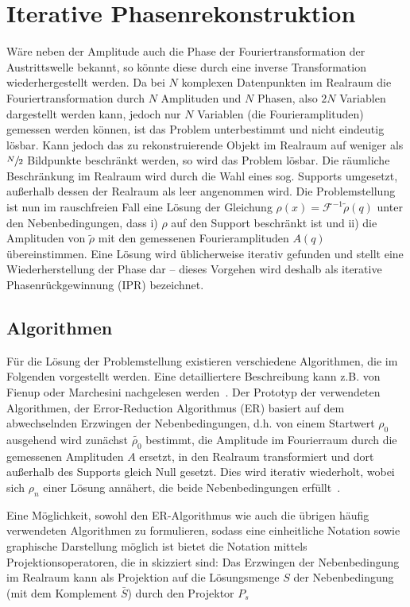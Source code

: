 \section{Iterative Phasenrekonstruktion}
Wäre neben der Amplitude auch die Phase der Fouriertransformation der Austrittswelle bekannt, so könnte diese durch eine inverse Transformation wiederhergestellt werden. 
Da bei $N$ komplexen Datenpunkten im Realraum die Fouriertransformation durch $N$ Amplituden und $N$ Phasen, also $2N$ Variablen dargestellt werden kann, jedoch nur $N$ Variablen (die Fourieramplituden) gemessen werden können, ist das Problem unterbestimmt und nicht eindeutig lösbar. Kann jedoch das zu rekonstruierende Objekt im Realraum auf weniger als $\sfrac{N}{2}$ Bildpunkte beschränkt werden, so wird das Problem lösbar. Die räumliche Beschränkung im Realraum wird durch die Wahl eines sog. Supports umgesetzt, außerhalb dessen der Realraum als leer angenommen wird.  
Die Problemstellung ist nun im rauschfreien Fall eine Lösung der Gleichung $\rho(x)=\mathscr{F}^{-1}\tilde{\rho}(q)$ unter den Nebenbedingungen, dass i) $\rho$ auf den Support beschränkt ist und ii) die Amplituden von $\tilde{\rho}$ mit den gemessenen Fourieramplituden $A(q)$ übereinstimmen. Eine Lösung wird üblicherweise iterativ gefunden und stellt eine Wiederherstellung der Phase dar -- dieses Vorgehen wird deshalb als iterative Phasenrückgewinnung (IPR) bezeichnet.
\subsection{Algorithmen}
Für die Lösung der Problemstellung existieren verschiedene Algorithmen, die im Folgenden vorgestellt werden. Eine detailliertere Beschreibung kann z.B. von Fienup oder Marchesini nachgelesen werden~\cite{marchesini2007,fienup1982}.
Der Prototyp der verwendeten Algorithmen, der Error-Reduction Algorithmus (ER) basiert auf dem abwechselnden Erzwingen der Nebenbedingungen, d.h. von einem Startwert $\rho_0$ ausgehend wird zunächst $\tilde{\rho_0}$ bestimmt, die Amplitude im Fourierraum durch die gemessenen Amplituden $A$ ersetzt, in den Realraum transformiert und dort außerhalb des Supports gleich Null gesetzt. Dies wird iterativ wiederholt, wobei sich $\rho_n$ einer Lösung annähert, die beide Nebenbedingungen erfüllt~\cite{fienup1978}.

Eine Möglichkeit, sowohl den ER-Algorithmus wie auch die übrigen häufig verwendeten Algorithmen zu formulieren, sodass eine einheitliche Notation sowie graphische Darstellung möglich ist bietet die Notation mittels Projektionsoperatoren, die in  skizziert sind:
Das Erzwingen der Nebenbedingung im Realraum kann als Projektion auf die Lösungsmenge $S$ der Nebenbedingung  (mit dem Komplement $\bar{S}$) durch den Projektor $P_s$ 

